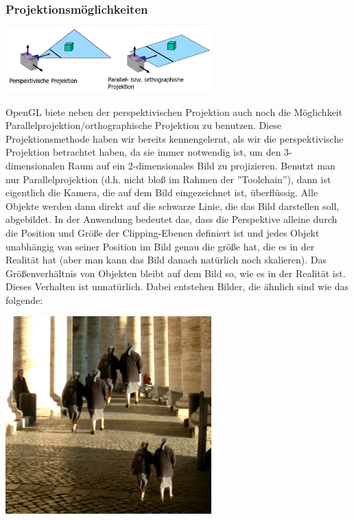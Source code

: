 \subsubsection*{Projektionsmöglichkeiten}


\includegraphics[width=300px]{images/projektionsmoeglichkeiten.png}


OpenGL biete neben der perspektivischen Projektion auch noch die Möglichkeit Parallelprojektion/orthographische Projektion zu benutzen. Diese Projektionsmethode haben wir bereits kennengelernt, als wir die perspektivische Projektion betrachtet haben, da sie immer notwendig ist, um den 3-dimensionalen Raum auf ein 2-dimensionales Bild zu projizieren. Benutzt man nur Parallelprojektion (d.h. nicht bloß im Rahmen der ''Toolchain''), dann ist eigentlich die Kamera, die auf dem Bild eingezeichnet ist, überflüssig. Alle Objekte werden dann direkt auf die schwarze Linie, die das Bild darstellen soll, abgebildet. In der Anwendung bedeutet das, dass die Perspektive alleine durch die Position und Größe der Clipping-Ebenen definiert ist und jedes Objekt unabhängig von seiner Position im Bild genau die größe hat, die es in der Realität hat (aber man kann das Bild danach natürlich noch skalieren). Das Größenverhältnis von Objekten bleibt auf dem Bild so, wie es in der Realität ist. Dieses Verhalten ist unnatürlich. Dabei entstehen Bilder, die ähnlich sind wie das folgende:

\vspace{10px}

\includegraphics[width=300px]{images/perspektivischeWahrnehmung.png}

